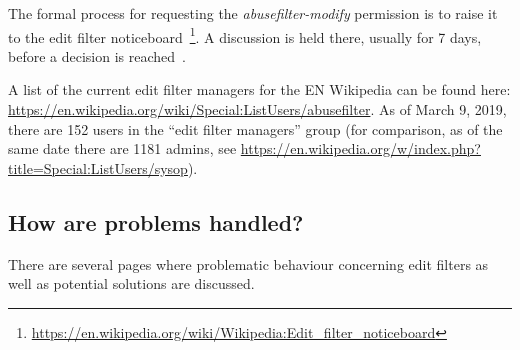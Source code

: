 \documentclass{sigchi}
\begin{document}
The formal process for requesting the \emph{abusefilter-modify} permission is to raise it to the edit filter noticeboard~\footnote{\url{https://en.wikipedia.org/wiki/Wikipedia:Edit_filter_noticeboard}}.
A discussion is held there, usually for 7 days, before a decision is reached~\cite{Wikipedia:EditFilter}.

A list of the current edit filter managers for the EN Wikipedia can be found here: \url{https://en.wikipedia.org/wiki/Special:ListUsers/abusefilter}.
As of March 9, 2019, there are 152 users in the ``edit filter managers'' group (for comparison, as of the same date there are 1181 admins, see \url{https://en.wikipedia.org/w/index.php?title=Special:ListUsers/sysop}).

\subsection{How are problems handled?}

There are several pages where problematic behaviour concerning edit filters as well as potential solutions are discussed.
\end{document}

